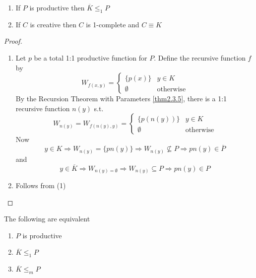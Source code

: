 \documentclass[11pt]{article}
\begin{document}
\begin{theorem}[Myhill]
\begin{enumerate}
\item If \(P\) is productive then \(\overbar{K}\le_1 P\)
\item If \(C\) is creative then \(C\) is 1-complete and \(C\equiv K\)
\end{enumerate}
\end{theorem}

\begin{proof}
\begin{enumerate}
\item Let \(p\) be a total 1:1 productive function for \(P\). Define the
recursive function \(f\) by
\begin{equation*}
W_{f(x,y)}=
\begin{cases}
\{p(x)\}&y\in K\\
\emptyset&\text{otherwise}
\end{cases}
\end{equation*}
By the Recursion Theorem with Parameters \ref{thm2.3.5}, there is a 1:1
recursive function \(n(y)\) s.t.
\begin{equation*}
W_{n(y)}=W_{f(n(y),y)}=
\begin{cases}
\{p(n(y))\}&y\in K\\
\emptyset&\text{otherwise}
\end{cases}
\end{equation*}
Now
\begin{equation*}
y\in K\Longrightarrow W_{n(y)}=\{pn(y)\}\Longrightarrow
W_{n(y)}\not\subseteq P\Longrightarrow pn(y)\in\overbar{P}
\end{equation*}
and
\begin{equation*}
y\in\overbar{K}\Longrightarrow W_{n(y)=\emptyset}\Longrightarrow
W_{n(y)}\subseteq P\Longrightarrow pn(y)\in P
\end{equation*}
\item Follows from (1)
\end{enumerate}
\end{proof}

\begin{corollary}[]
The following are equivalent
\begin{enumerate}
\item \(P\) is productive
\item \(\overbar{K}\le_1 P\)
\item \(\overbar{K}\le_m P\)
\end{enumerate}
\end{corollary}
\end{document}
